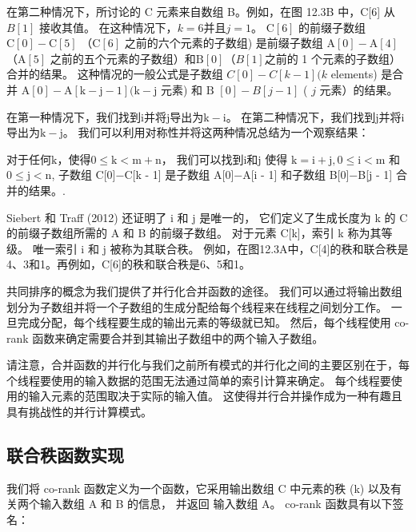 在第二种情况下，所讨论的 $\mathrm{C}$ 元素来自数组 B。例如，在图 12.3B 中，C[6] 从 $B[1]$ 接收其值。 
在这种情况下，$k=6$并且$j=1$。 $\mathrm{C}[6]$ 的前缀子数组 $\mathrm{C}[0]-\mathrm{C}[5]$ 
（$\mathrm{C}[6]$ 之前的六个元素的子数组) 是前缀子数组 $\mathrm{A}[0]-\mathrm{A}[4]$ 
（$\mathrm{A}[5]$ 之前的五个元素的子数组）和$\mathrm{B}[0]$（$B[1]$之前的 1 个元素的子数组）合并的结果。 
这种情况的一般公式是子数组 $C[0]-C[k-1](k$ elements) 是合并 $\mathrm{A}[0]-\mathrm{A}[\mathrm{ k}-\mathrm{j}-1](\mathrm{k}-\mathrm{j}$ 元素) 和 $\mathrm{B}$ $[0]-B[j-1]$ ( $j$ 元素）的结果。

在第一种情况下，我们找到$\mathrm{i}$并将$\mathrm{j}$导出为$\mathrm{k}-\mathrm{i}$。 
在第二种情况下，我们找到$\mathrm{j}$并将$\mathrm{i}$导出为$\mathrm{k}-\mathrm{j}$。 
我们可以利用对称性并将这两种情况总结为一个观察结果：

\begin{Observation}
对于任何$\mathrm{k}$，使得$0 \leq \mathrm{k}<\mathrm{m}+\mathrm{n}$，
我们可以找到$\mathrm{i}$和$\mathrm {j}$ 
使得 $\mathrm{k}=\mathrm{i}+\mathrm{j}, 0 \leq \mathrm{i}<\mathrm{m}$ 
和 $0 \leq \mathrm {j}<\mathrm{n}$, 
子数组 C[0]−C[k - 1] 是子数组 A[0]−A[i - 1] 和子数组 B[0]−B[j - 1] 合并的结果。.
\end{Observation}

Siebert 和 Traff (2012) 还证明了 i 和 j 是唯一的，
它们定义了生成长度为 k 的 C 的前缀子数组所需的 A 和 B 的前缀子数组。 对于元素 C[k]，索引 k 称为其等级。 
唯一索引 i 和 j 被称为其联合秩。 例如，在图12.3A中，C[4]的秩和联合秩是4、3和1。再例如，C[6]的秩和联合秩是6、5和1。

共同排序的概念为我们提供了并行化合并函数的途径。 
我们可以通过将输出数组划分为子数组并将一个子数组的生成分配给每个线程来在线程之间划分工作。 
一旦完成分配，每个线程要生成的输出元素的等级就已知。 
然后，每个线程使用 co-rank 函数来确定需要合并到其输出子数组中的两个输入子数组。

请注意，合并函数的并行化与我们之前所有模式的并行化之间的主要区别在于，每个线程要使用的输入数据的范围无法通过简单的索引计算来确定。 每个线程要使用的输入元素的范围取决于实际的输入值。 这使得并行合并操作成为一种有趣且具有挑战性的并行计算模式。

\subsection{联合秩函数实现}
我们将 co-rank 函数定义为一个函数，它采用输出数组 C 中元素的秩 (k) 以及有关两个输入数组 A 和 B 的信息，
并返回 输入数组 A。 co-rank 函数具有以下签名：

